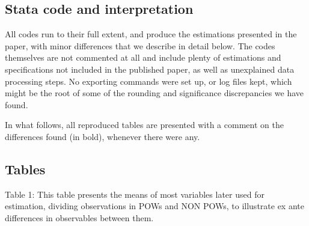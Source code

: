 \documentclass[a4paper]{report}\usepackage{graphicx, color}
\begin{document}
\begin{refsection}
\section{Stata code and interpretation}
All codes run to their full extent, and produce the estimations presented in the paper, with minor differences that we describe in detail below. The codes themselves are not commented at all and include plenty of estimations and specifications not included in the published paper, as well as unexplained data processing steps. No exporting commands were set up, or log files kept, which might be the root of some of the rounding and significance discrepancies we have found. 

In what follows, all reproduced tables are presented with a comment on the differences found (in bold), whenever there were any.

\subsection{Tables}
Table 1: This table presents the means of most variables later used for estimation, dividing observations in POWs and NON POWs, to illustrate ex ante differences in observables between them.


\end{refsection}
\end{document}
